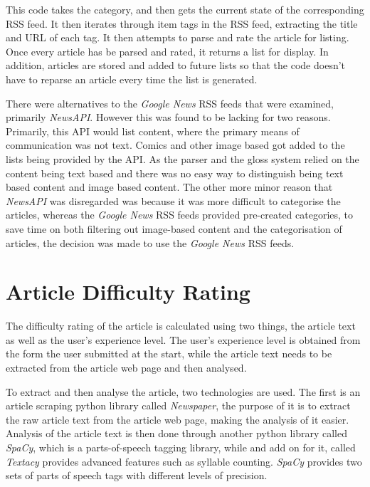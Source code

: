 

This code takes the category, and then gets the current state of the corresponding RSS feed. It then iterates through item tags in the RSS feed, extracting the title and URL of each tag. It then attempts to parse and rate the article for listing. Once every article has be parsed and rated, it returns a list for display. In addition, articles are stored and added to future lists so that the code doesn't have to reparse an article every time the list is generated.

There were alternatives to the \textit{Google News} RSS feeds that were examined, primarily \textit{NewsAPI}. However this was found to be lacking for two reasons. Primarily, this API would list content, where the primary means of communication was not text. Comics and other image based got added to the lists being provided by the API. As the parser and the gloss system relied on the content being text based and there was no easy way to distinguish being text based content and image based content. The other more minor reason that \textit{NewsAPI} was disregarded was because it was more difficult to categorise the articles, whereas the \textit{Google News} RSS feeds provided pre-created categories, to save time on both filtering out image-based content and the categorisation of articles, the decision was made to use the \textit{Google News} RSS feeds. 


\section{Article Difficulty Rating}

The difficulty rating of the article is calculated using two things, the article text as well as the user's experience level. The user's experience level is obtained from the form the user submitted at the start, while the article text needs to be extracted from the article web page and then analysed.

To extract and then analyse the article, two technologies are used. The first is an article scraping python library called \textit{Newspaper}, the purpose of it is to extract the raw article text from the article web page, making the analysis of it easier. Analysis of the article text is then done through another python library called \textit{SpaCy}, which is a parts-of-speech tagging library, while and add on for it, called \textit{Textacy} provides advanced features such as syllable counting. \textit{SpaCy} provides two  sets of parts of speech tags with different levels of precision. 

